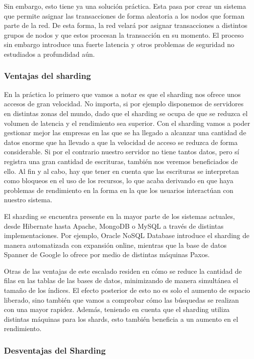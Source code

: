 \documentclass[twoside,twocolumn]{article}
\begin{document}
Sin embargo, esto tiene ya una solución práctica.
 Esta pasa por crear un sistema que permite asignar las 
 transacciones de forma aleatoria a los nodos que forman parte
  de la red. De esta forma, la red velará por asignar transacciones
   a distintos grupos de nodos y que estos procesan la transacción 
   en su momento. El proceso sin embargo introduce una fuerte latencia 
   y otros problemas de seguridad no estudiados a profundidad aún.
\subsubsection{Ventajas del sharding}

En la práctica lo primero que vamos a notar es que el sharding nos ofrece unos 
accesos de gran velocidad. No importa, si por ejemplo disponemos de servidores 
en distintas zonas del mundo, dado que el sharding se ocupa de que se reduzca 
el volumen de latencia y el rendimiento sea superior. Con el sharding vamos a 
poder gestionar mejor las empresas en las que se ha llegado a alcanzar una 
cantidad de datos enorme que ha llevado a que la velocidad de acceso se reduzca 
de forma considerable. Si por el contrario nuestro servidor no tiene tantos datos,
 pero sí registra una gran cantidad de escrituras, también nos veremos 
 beneficiados de ello. Al fin y al cabo, hay que tener en cuenta que las
  escrituras se interpretan como bloqueos en el uso de los recursos, lo que
   acaba derivando en que haya problemas de rendimiento en la forma en la que 
   los usuarios interactúan con nuestro sistema.

El sharding se encuentra presente en la mayor parte de los sistemas actuales,
 desde Hibernate hasta Apache, MongoDB o MySQL a través de distintas 
 implementaciones. Por ejemplo, Oracle NoSQL Database introduce el sharding
  de manera automatizada con expansión online, mientras que la base de datos 
  Spanner de Google lo ofrece por medio de distintas máquinas Paxos.

Otras de las ventajas de este escalado residen en cómo se reduce la cantidad 
de filas en las tablas de las bases de datos, minimizando de manera simultánea
 el tamaño de los índices. El efecto posterior de esto no es solo el aumento de
  espacio liberado, sino también que vamos a comprobar cómo las búsquedas se
   realizan con una mayor rapidez. Además, teniendo en cuenta que el sharding 
   utiliza distintas máquinas para los shards, esto también beneficia a un 
   aumento en el rendimiento.
\subsubsection{Desventajas del Sharding}
\end{document}
